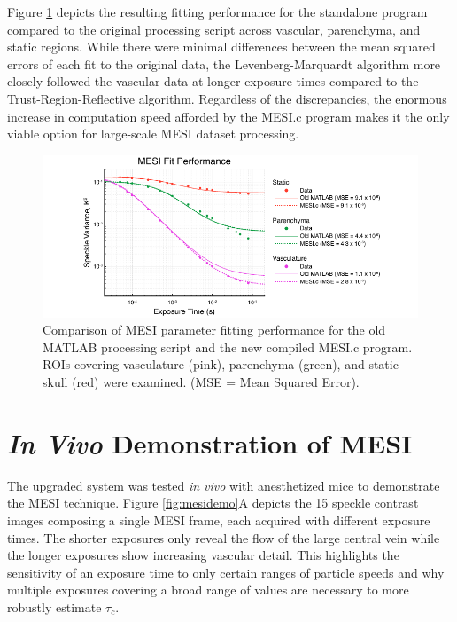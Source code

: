Figure \ref{fig:mesifit} depicts the resulting fitting performance for the standalone program compared to the original processing script across vascular, parenchyma, and static regions. While there were minimal differences between the mean squared errors of each fit to the original data, the Levenberg-Marquardt algorithm more closely followed the vascular data at longer exposure times compared to the Trust-Region-Reflective algorithm. Regardless of the discrepancies, the enormous increase in computation speed afforded by the MESI.c program makes it the only viable option for large-scale MESI dataset processing.

\begin{figure}
    \includegraphics{figures/chapter_4/mesifit.pdf}
    \caption[Comparison of MESI parameter fitting performance for the old MATLAB processing script and the new compiled MESI.c program. ROIs covering vasculature (pink), parenchyma (green), and static skull (red) were examined. (MSE = Mean Squared Error).]{
        \label{fig:mesifit}
        Comparison of MESI parameter fitting performance for the old MATLAB processing script and the new compiled MESI.c program. ROIs covering vasculature (pink), parenchyma (green), and static skull (red) were examined. (MSE = Mean Squared Error).
    }
\end{figure}



\section{\textit{In Vivo} Demonstration of MESI}

The upgraded system was tested \textit{in vivo} with anesthetized mice to demonstrate the MESI technique. Figure \ref{fig:mesidemo}A depicts the 15 speckle contrast images composing a single MESI frame, each acquired with different exposure times. The shorter exposures only reveal the flow of the large central vein while the longer exposures show increasing vascular detail. This highlights the sensitivity of an exposure time to only certain ranges of particle speeds and why multiple exposures covering a broad range of values are necessary to more robustly estimate $\tau_c$.

